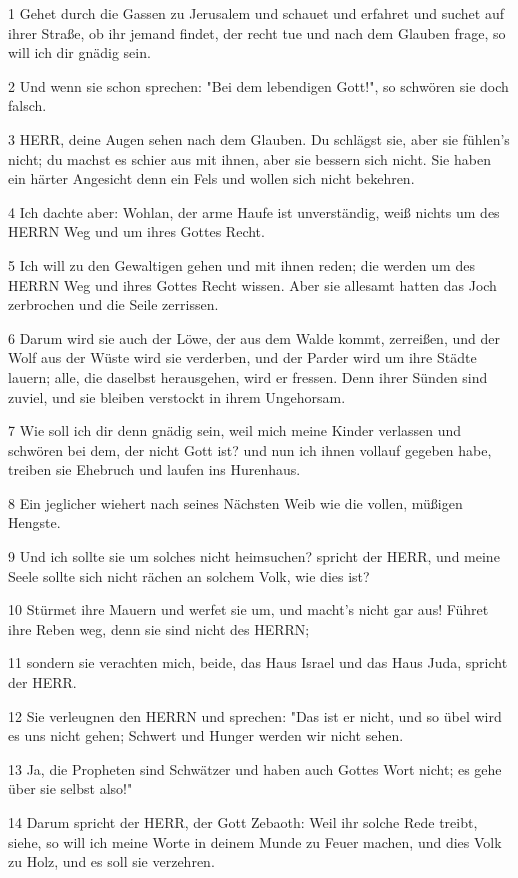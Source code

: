 \par 1 Gehet durch die Gassen zu Jerusalem und schauet und erfahret und suchet auf ihrer Straße, ob ihr jemand findet, der recht tue und nach dem Glauben frage, so will ich dir gnädig sein.
\par 2 Und wenn sie schon sprechen: "Bei dem lebendigen Gott!", so schwören sie doch falsch.
\par 3 HERR, deine Augen sehen nach dem Glauben. Du schlägst sie, aber sie fühlen's nicht; du machst es schier aus mit ihnen, aber sie bessern sich nicht. Sie haben ein härter Angesicht denn ein Fels und wollen sich nicht bekehren.
\par 4 Ich dachte aber: Wohlan, der arme Haufe ist unverständig, weiß nichts um des HERRN Weg und um ihres Gottes Recht.
\par 5 Ich will zu den Gewaltigen gehen und mit ihnen reden; die werden um des HERRN Weg und ihres Gottes Recht wissen. Aber sie allesamt hatten das Joch zerbrochen und die Seile zerrissen.
\par 6 Darum wird sie auch der Löwe, der aus dem Walde kommt, zerreißen, und der Wolf aus der Wüste wird sie verderben, und der Parder wird um ihre Städte lauern; alle, die daselbst herausgehen, wird er fressen. Denn ihrer Sünden sind zuviel, und sie bleiben verstockt in ihrem Ungehorsam.
\par 7 Wie soll ich dir denn gnädig sein, weil mich meine Kinder verlassen und schwören bei dem, der nicht Gott ist? und nun ich ihnen vollauf gegeben habe, treiben sie Ehebruch und laufen ins Hurenhaus.
\par 8 Ein jeglicher wiehert nach seines Nächsten Weib wie die vollen, müßigen Hengste.
\par 9 Und ich sollte sie um solches nicht heimsuchen? spricht der HERR, und meine Seele sollte sich nicht rächen an solchem Volk, wie dies ist?
\par 10 Stürmet ihre Mauern und werfet sie um, und macht's nicht gar aus! Führet ihre Reben weg, denn sie sind nicht des HERRN;
\par 11 sondern sie verachten mich, beide, das Haus Israel und das Haus Juda, spricht der HERR.
\par 12 Sie verleugnen den HERRN und sprechen: "Das ist er nicht, und so übel wird es uns nicht gehen; Schwert und Hunger werden wir nicht sehen.
\par 13 Ja, die Propheten sind Schwätzer und haben auch Gottes Wort nicht; es gehe über sie selbst also!"
\par 14 Darum spricht der HERR, der Gott Zebaoth: Weil ihr solche Rede treibt, siehe, so will ich meine Worte in deinem Munde zu Feuer machen, und dies Volk zu Holz, und es soll sie verzehren.
